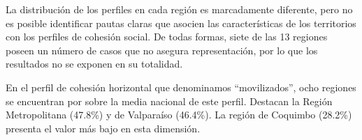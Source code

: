 \documentclass[
  12pt,
]{book}
\begin{document}
\begin{table}

\caption{\label{tab:clases-region}Distribución de los perfiles de cohesión social por región}
\centering
{}
\end{table}

La distribución de los perfiles en cada región es marcadamente diferente, pero no es posible identificar pautas claras que asocien las características de los territorios con los perfiles de cohesión social. De todas formas, siete de las 13 regiones poseen un número de casos que no asegura representación, por lo que los resultados no se exponen en su totalidad.

En el perfil de cohesión horizontal que denominamos ``movilizados'', ocho regiones se encuentran por sobre la media nacional de este perfil. Destacan la Región Metropolitana (47.8\%) y de Valparaíso (46.4\%). La región de Coquimbo (28.2\%) presenta el valor más bajo en esta dimensión.
\end{document}
